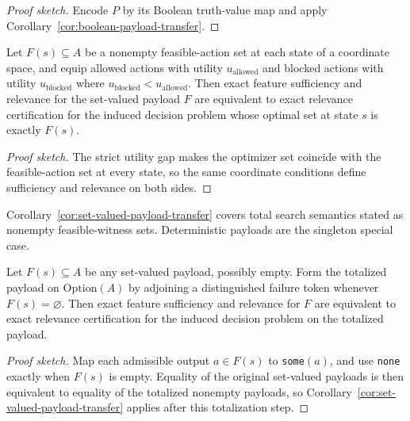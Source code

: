 \begin{proof}[Proof sketch]
Encode $P$ by its Boolean truth-value map and apply Corollary~\ref{cor:boolean-payload-transfer}.
\end{proof}

\begin{corollary}\label{cor:set-valued-payload-transfer}
Let $F(s) \subseteq A$ be a nonempty feasible-action set at each state of a coordinate space, and equip allowed actions with utility $u_{\mathrm{allowed}}$ and blocked actions with utility $u_{\mathrm{blocked}}$ where $u_{\mathrm{blocked}} < u_{\mathrm{allowed}}$. Then exact feature sufficiency and relevance for the set-valued payload $F$ are equivalent to exact relevance certification for the induced decision problem whose optimal set at state $s$ is exactly $F(s)$.
\end{corollary}

\begin{proof}[Proof sketch]
The strict utility gap makes the optimizer set coincide with the feasible-action set at every state, so the same coordinate conditions define sufficiency and relevance on both sides.
\end{proof}

Corollary~\ref{cor:set-valued-payload-transfer} covers total search semantics stated as nonempty feasible-witness sets. Deterministic payloads are the singleton special case.

\begin{corollary}\label{cor:totalized-set-valued-payload-transfer}
Let $F(s) \subseteq A$ be any set-valued payload, possibly empty. Form the totalized payload on $\mathrm{Option}(A)$ by adjoining a distinguished failure token whenever $F(s)=\varnothing$. Then exact feature sufficiency and relevance for $F$ are equivalent to exact relevance certification for the induced decision problem on the totalized payload.
\end{corollary}

\begin{proof}[Proof sketch]
Map each admissible output $a \in F(s)$ to \texttt{some}$(a)$, and use \texttt{none} exactly when $F(s)$ is empty. Equality of the original set-valued payloads is then equivalent to equality of the totalized nonempty payloads, so Corollary~\ref{cor:set-valued-payload-transfer} applies after this totalization step.
\end{proof}

